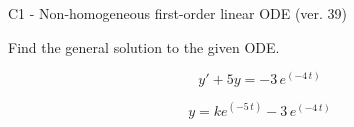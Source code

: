 \begin{exercise}
  \begin{exerciseTitle}C1 - Non-homogeneous first-order linear ODE (ver. 39)\end{exerciseTitle}
  \begin{exerciseStatement}
    
Find the general solution to the given ODE.

    
\[y'+5y= -3 \, e^{\left(-4 \, t\right)}\]

  \end{exerciseStatement}
  \begin{exerciseAnswer}
    
\[y= k e^{\left(-5 \, t\right)} - 3 \, e^{\left(-4 \, t\right)}\]

  \end{exerciseAnswer}
\end{exercise}
